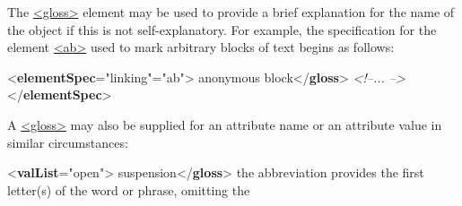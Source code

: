 The \hyperref[TEI.gloss]{<gloss>} element may be used to provide a brief explanation for the name of the object if this is not self-explanatory. For example, the specification for the element \hyperref[TEI.ab]{<ab>} used to mark arbitrary blocks of text begins as follows: \par\bgroup{}\exampleFont \begin{shaded}\noindent\mbox{}{<\textbf{elementSpec}\hspace*{1em}{module}="{linking}"\hspace*{1em}{ident}="{ab}">}\mbox{}\newline 
{}anonymous block{</\textbf{gloss}>}\mbox{}\newline 
\textit{<!--... -->}\mbox{}\newline 
{</\textbf{elementSpec}>}\end{shaded}\egroup\par \noindent  A \hyperref[TEI.gloss]{<gloss>} may also be supplied for an attribute name or an attribute value in similar circumstances: \par\bgroup{}\exampleFont \begin{shaded}\noindent\mbox{}{<\textbf{valList}\hspace*{1em}{type}="{open}">}\mbox{}\newline 
{}\mbox{}\newline 
\hspace*{1em}suspension{</\textbf{gloss}>}\mbox{}\newline 
\hspace*{1em}the abbreviation provides the first letter(s) of the word or phrase, omitting the\mbox{}\newline 

\end{shaded}
